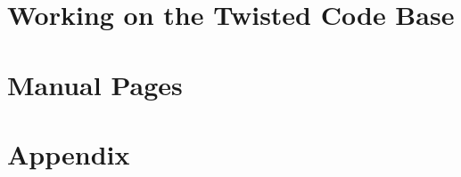 \documentclass[oneside]{book}
\begin{document}
\chapter{Working on the Twisted Code Base}






\chapter{Manual Pages}


\clearpage

\clearpage

\clearpage

\clearpage

\clearpage

\clearpage

\clearpage

\clearpage

\clearpage

\clearpage

\clearpage

\clearpage


\chapter{Appendix}




\end{document}
